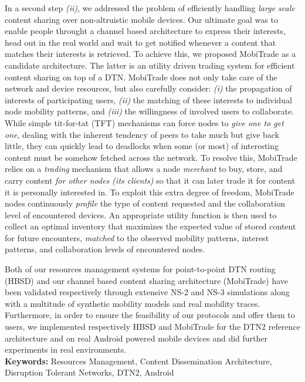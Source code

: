 \documentclass[a4paper,11pt,twoside]{ThesisStyle}
\begin{document}
In a second step \emph{(ii)}, we addressed the problem of efficiently handling \emph{large scale} content sharing over non-altruistic mobile devices. Our ultimate goal was to enable people throught a channel based architecture to express their interests, head out in the real world and wait to get notified whenever a content that matches their interests is retrieved. To achieve this, we proposed MobiTrade as a candidate architecture. The latter is an utility driven trading system for efficient content sharing on top of a DTN. MobiTrade does not only take care of the network and device resources, but also carefully consider: \emph{(i)} the propagation of interests of participating users, \emph{(ii)} the matching of these interests to individual node mobility patterns, and \emph{(iii)} the willingness of involved users to collaborate. While simple tit-for-tat (TFT) mechanisms can force nodes to \emph{give one to get one}, dealing with the inherent tendency of peers to take much but give back little, they can quickly lead to deadlocks when some (or most) of interesting content must be somehow fetched across the network. To resolve this, MobiTrade relies on a \emph{trading} mechanism that allows a node \emph{merchant} to buy, store, and carry content \emph{for other nodes  (its clients)} so that it can later trade it for content it is personally interested in. To exploit this extra degree of freedom, MobiTrade nodes continuously \emph{profile} the type of content requested and the collaboration level of encountered devices. An appropriate utility function is then used to collect an optimal inventory that maximizes the expected value of stored content for future encounters, \emph{matched} to the observed mobility patterns, interest patterns, and collaboration levels of encountered nodes. 

Both of our resources management systems for point-to-point DTN routing (HBSD) and our channel based content sharing architecture (MobiTrade) have been validated respectively through extensive NS-2 and NS-3 simulations along with a multitude of synthetic mobility models and real mobility traces. Furthermore, in order to ensure the feasibility of our protocols and offer them to users, we implemented respectively HBSD and MobiTrade for the DTN2 reference architecture and on real Android powered mobile devices and did further experiments in real environments.  
\\
{\large\textbf{Keywords:}}
Resources Management, Content Dissemination Architecture, Disruption Tolerant Networks, DTN2, Android  

\tableofcontents

\mainmatter










%

%



\end{document}
